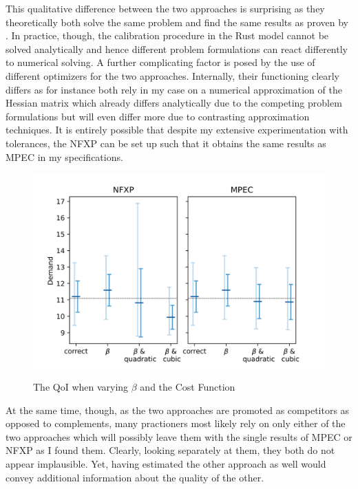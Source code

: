 This qualitative difference between the two approaches is surprising as they theoretically both solve the same problem and find the same results as proven by \cite{Su.Judd.2012}. In practice, though, the calibration procedure in the Rust model cannot be solved analytically and hence different problem formulations can react differently to numerical solving. A further complicating factor is posed by the use of different optimizers for the two approaches. Internally, their functioning clearly differs as for instance both rely in my case on a numerical approximation of the Hessian matrix which already differs analytically due to the competing problem formulations but will even differ more due to contrasting approximation techniques. It is entirely possible that despite my extensive experimentation with tolerances, the NFXP can be set up such that it obtains the same results as MPEC in my specifications.

\begin{figure}[!t]
	\caption{The QoI when varying $\beta$ and the Cost Function}
	\vspace*{-4mm}
	\centering
	\includegraphics[scale=0.9]{../figures/figure_6.png}
	\label{figure6}
\end{figure}

At the same time, though, as the two approaches are promoted as competitors as opposed to complements, many practioners most likely rely on only either of the two approaches which will possibly leave them with the single results of MPEC or NFXP as I found them. Clearly, looking separately at them, they both do not appear implausible. Yet, having estimated the other approach as well would convey additional information about the quality of the other.

